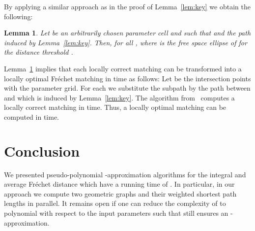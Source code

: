 \documentclass[a4paper,11pt]{article}
\newtheorem{lemma}{Lemma}
\begin{document}
	By applying a similar approach as in the proof of Lemma~\ref{lem:key} we obtain the following:
	
\begin{lemma}\label{cor:partFS}
	Let  be an arbitrarily chosen parameter cell and  such that  and  the path induced by Lemma~\ref{lem:key}. Then,  for all , where  is the free space ellipse of  for the distance threshold .
\end{lemma}

Lemma~\ref{cor:partFS} implies that each locally correct matching  can be transformed into a locally optimal Fr\'{e}chet matching in  time as follows: Let  be the intersection points with the parameter grid. For each  we substitute the subpath  by the path between  and  which is induced by Lemma~\ref{lem:key}.
	The algorithm from~\cite{buchin:locally} computes a locally correct matching in  time. Thus, a locally optimal matching can be computed in  time.

\section{Conclusion}

	We presented pseudo-polynomial -approximation algorithms for the integral and average Fr\'{e}chet distance which have a running time of . In particular, in our approach we compute two geometric graphs and their weighted shortest path lengths in parallel. It remains open if one can reduce the complexity of  to polynomial with respect to the input parameters such that   still ensures an -approximation. 
	
\end{document}
